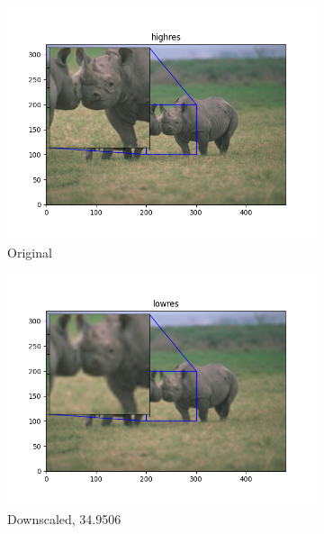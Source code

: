 \documentclass[12pt]{article}
\begin{document}
\begin{figure}[h!]
  \begin{subfigure}[b]{0.32\linewidth}
    \includegraphics[width=\linewidth]{./2-highres.png}
    \caption{Original}
  \end{subfigure}
  \hfill
  \begin{subfigure}[b]{0.32\linewidth}
    \includegraphics[width=\linewidth]{./2-lowres.png}
    \caption{Downscaled, 34.9506}
  \end{subfigure}
  \hfill
  \begin{subfigure}[b]{0.32\linewidth}

\end{subfigure}
\end{figure}
\end{document}
